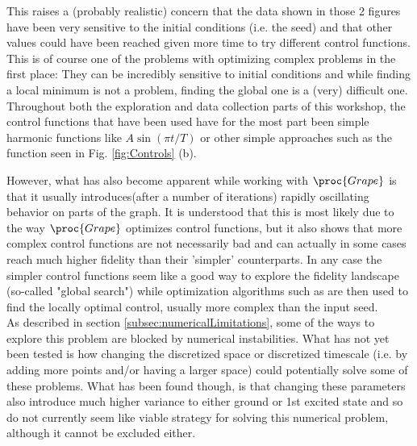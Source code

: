 \documentclass[a4paper, twocolumn]{revtex4-1}
\begin{document}
This raises a (probably realistic) concern that the data shown in those 2 figures have been very sensitive to the initial conditions (i.e. the seed) and that other values could have been reached given more time to try different control functions. This is of course one of the problems with optimizing complex problems in the first place: They can be incredibly sensitive to initial conditions and while finding a local minimum is not a problem, finding the global one is a (very) difficult one.\\

Throughout both the exploration and data collection parts of this workshop, the control functions that have been used have for the most part been simple harmonic functions like $A\sin(\pi t/T)$ or other simple approaches such as the function seen in Fig. \ref{fig:Controls} (b).

However, what has also become apparent while working with $\proc{Grape}$ is that it usually introduces(after a number of iterations) rapidly oscillating behavior on parts of the graph. It is understood that this is most likely due to the way $\proc{Grape}$ optimizes control functions, but it also shows that more complex control functions are not necessarily bad and can actually in some cases reach much higher fidelity than their 'simpler' counterparts. In any case the simpler control functions seem like a good way to explore the fidelity landscape (so-called "global search") while optimization algorithms such as  are then used to find the locally optimal control, usually more complex than the input seed. \\

As described in section \ref{subsec:numericalLimitations}, some of the ways to explore this problem are blocked by numerical instabilities. What has not yet been tested is how changing the discretized space or discretized timescale (i.e. by adding more points and/or having a larger space) could potentially solve some of these problems. What has been found though, is that changing these parameters also introduce much higher variance to either ground or 1st excited state and so do not currently seem like viable strategy for solving this numerical problem, although it cannot be excluded either.
\end{document}
